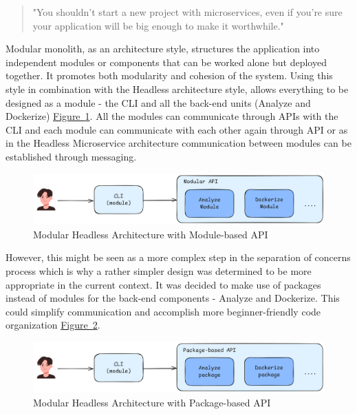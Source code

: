 \documentclass[twocolumn]{article}
\newcommand{\FigRef}[1]{\hyperref[#1]{Figure~\ref{#1}}}
\begin{document}
\begin{quote}
    "You shouldn't start a new project with microservices, even if you're sure your application will be big enough to make it worthwhile."
\end{quote}

Modular monolith, as an architecture style, structures the application into independent modules or components that can be worked alone but deployed together. It promotes both modularity and cohesion of the system. Using this style in combination with the Headless architecture style, allows everything to be designed as a module - the CLI and all the back-end units (Analyze and Dockerize) \FigRef{fig:modular-headless-architecture-level-2}. All the modules can communicate through APIs with the CLI and each module can communicate with each other again through API or as in the Headless Microservice architecture communication between modules can be established through messaging.

\begin{figure}[H]
    \centering
    \includegraphics[width=\linewidth]{images/modular-headless-architecture-level-2.png}
    \caption{Modular Headless Architecture with Module-based API}
    \label{fig:modular-headless-architecture-level-2}
\end{figure}

However, this might be seen as a more complex step in the separation of concerns process which is why a rather simpler design was determined to be more appropriate in the current context. It was decided to make use of packages instead of modules for the back-end components - Analyze and Dockerize. This could simplify communication and accomplish more beginner-friendly code organization \FigRef{fig:modular-headless-architecture-level-1}.

\begin{figure}[H]
    \centering
    \includegraphics[width=\linewidth]{images/modular-headless-architecture-level-1.png}
    \caption{Modular Headless Architecture with Package-based API}
    \label{fig:modular-headless-architecture-level-1}
\end{figure}
\end{document}
